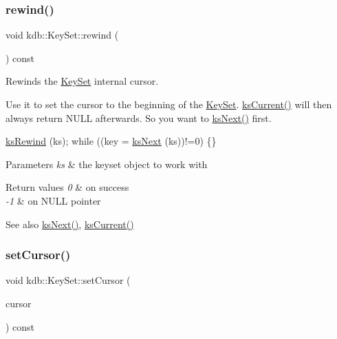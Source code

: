 \subsubsection{\texorpdfstring{rewind()}{rewind()}}
{\footnotesize\ttfamily void kdb\+::\+Key\+Set\+::rewind (\begin{DoxyParamCaption}{ }\end{DoxyParamCaption}) const\hspace{0.3cm}{\ttfamily [inline]}}



Rewinds the \hyperlink{classkdb_1_1KeySet}{Key\+Set} internal cursor. 

Use it to set the cursor to the beginning of the \hyperlink{classkdb_1_1KeySet}{Key\+Set}. \hyperlink{group__keyset_ga4287b9416912c5f2ab9c195cb74fb094}{ks\+Current()} will then always return N\+U\+LL afterwards. So you want to \hyperlink{group__keyset_ga317321c9065b5a4b3e33fe1c399bcec9}{ks\+Next()} first.


\begin{DoxyCode}
\hyperlink{group__keyset_gabe793ff51f1728e3429c84a8a9086b70}{ksRewind} (ks);
\textcolor{keywordflow}{while} ((key = \hyperlink{group__keyset_ga317321c9065b5a4b3e33fe1c399bcec9}{ksNext} (ks))!=0) \{\}
\end{DoxyCode}



\begin{DoxyParams}{Parameters}
{\em ks} & the keyset object to work with \\
\hline
\end{DoxyParams}

\begin{DoxyRetVals}{Return values}
{\em 0} & on success \\
\hline
{\em -\/1} & on N\+U\+LL pointer \\
\hline
\end{DoxyRetVals}
\begin{DoxySeeAlso}{See also}
\hyperlink{group__keyset_ga317321c9065b5a4b3e33fe1c399bcec9}{ks\+Next()}, \hyperlink{group__keyset_ga4287b9416912c5f2ab9c195cb74fb094}{ks\+Current()} 
\end{DoxySeeAlso}
\mbox{\label{classkdb_1_1KeySet_aa36d35d8f12233a4c8f88d9bb13429c3}} 
\subsubsection{\texorpdfstring{set\+Cursor()}{setCursor()}}
{\footnotesize\ttfamily void kdb\+::\+Key\+Set\+::set\+Cursor (\begin{DoxyParamCaption}\item[{elektra\+Cursor}]{cursor }\end{DoxyParamCaption}) const\hspace{0.3cm}{\ttfamily [inline]}}




